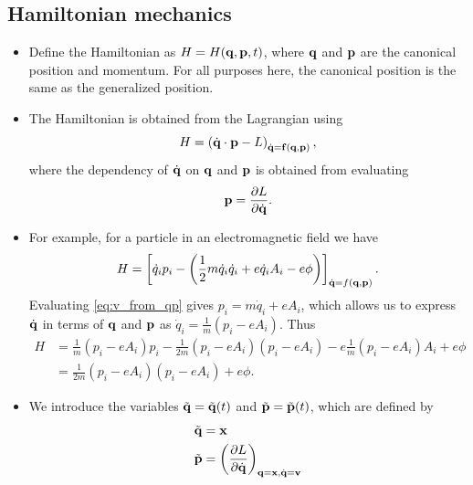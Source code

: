 \documentclass[a4paper,11pt]{report}
\newcommand{\qvecdot}{\dot{\qvec}}
\newcommand{\qdot}{\dot{q}}
\begin{document}
\subsection{Hamiltonian mechanics}
\begin{itemize}
    \item Define the Hamiltonian as $H = H(\mathbf{q}, \mathbf{p}, t)$, where $\mathbf{q}$ and $\mathbf{p}$ are the canonical position and momentum. For all purposes here, the canonical position is the same as the generalized position.
    
    \item The Hamiltonian is obtained from the Lagrangian using
    \begin{equation}
    H = \left ( \qvecdot \cdot \pvec - L \right)_{\qvecdot = \fvec(\qvec, \pvec)},
    \end{equation} 
    where the dependency of $\qvecdot$ on $\mathbf{q}$ and $\mathbf{p}$ is obtained from evaluating
    \begin{equation}
    \label{eq:v_from_qp}
    \pvec = \frac{ \partial L}{\partial \qvecdot}.
    \end{equation}
    
    \item For example, for a particle in an electromagnetic field we have
    \begin{equation}
    H = \left [ \qdot_i p_i - \left ( \frac{1}{2} m \qdot_i \qdot_i + e \qdot_i A_i - e\phi \right ) \right]_{\qvecdot = f(\qvec, \pvec)}. 
    \end{equation}
    Evaluating \cref{eq:v_from_qp} gives $ p_i = m \qdot_i + e A_i $, which allows us to express $\qvecdot$ in terms of $\mathbf{q}$ and $\mathbf{p}$ as $\qdot_i = \frac{1}{m} (p_i - eA_i )$. Thus
    \begin{align}
    H &= \frac{1}{m} (p_i - eA_i)p_i - \frac{1}{2m} (p_i - eA_i) (p_i-eA_i) - e\frac{1}{m} (p_i -eA_i) A_i + e\phi \nonumber \\
    & = \frac{1}{2m} (p_i -eA_i) (p_i -eA_i) + e\phi.
    \end{align}
    
    \item We introduce the variables $\tilde{\mathbf{q}} = \tilde{\mathbf{q}}(t)$ and $\tilde{\mathbf{p}} = \tilde{\mathbf{p}}(t)$, which are defined by
    \begin{align}
    \tilde{\qvec} &= \xvec \\ 
    \tilde{\pvec} & = \left ( \frac{\partial L}{\partial \qvecdot} \right)_{\qvec = \xvec, \qvecdot = \vvec}
    \end{align}
    

\end{itemize}
\end{document}

